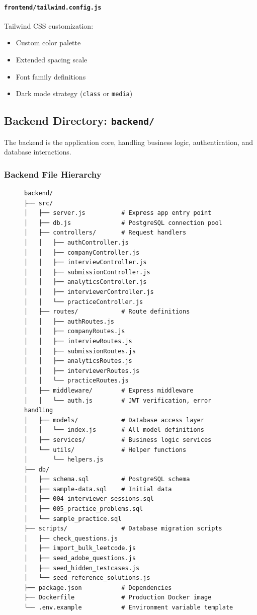 \documentclass[12pt,a4paper,oneside]{article}
\newcommand{\fileref}[1]{\texttt{#1}}
\begin{document}
\paragraph{\fileref{frontend/tailwind.config.js}}

Tailwind CSS customization:
\begin{itemize}
    \item Custom color palette
    \item Extended spacing scale
    \item Font family definitions
    \item Dark mode strategy (\texttt{class} or \texttt{media})
\end{itemize}

\newpage

\subsection{Backend Directory: \fileref{backend/}}

The backend is the application core, handling business logic, authentication, and database interactions.

\subsubsection{Backend File Hierarchy}

\begin{figure}[H]
\centering
\begin{verbatim}
backend/
├── src/
│   ├── server.js          # Express app entry point
│   ├── db.js              # PostgreSQL connection pool
│   ├── controllers/       # Request handlers
│   │   ├── authController.js
│   │   ├── companyController.js
│   │   ├── interviewController.js
│   │   ├── submissionController.js
│   │   ├── analyticsController.js
│   │   ├── interviewerController.js
│   │   └── practiceController.js
│   ├── routes/            # Route definitions
│   │   ├── authRoutes.js
│   │   ├── companyRoutes.js
│   │   ├── interviewRoutes.js
│   │   ├── submissionRoutes.js
│   │   ├── analyticsRoutes.js
│   │   ├── interviewerRoutes.js
│   │   └── practiceRoutes.js
│   ├── middleware/        # Express middleware
│   │   └── auth.js        # JWT verification, error handling
│   ├── models/            # Database access layer
│   │   └── index.js       # All model definitions
│   ├── services/          # Business logic services
│   └── utils/             # Helper functions
│       └── helpers.js
├── db/
│   ├── schema.sql         # PostgreSQL schema
│   ├── sample-data.sql    # Initial data
│   ├── 004_interviewer_sessions.sql
│   ├── 005_practice_problems.sql
│   └── sample_practice.sql
├── scripts/               # Database migration scripts
│   ├── check_questions.js
│   ├── import_bulk_leetcode.js
│   ├── seed_adobe_questions.js
│   ├── seed_hidden_testcases.js
│   └── seed_reference_solutions.js
├── package.json           # Dependencies
├── Dockerfile             # Production Docker image
└── .env.example           # Environment variable template
\end{verbatim}
\end{figure}
\end{document}
